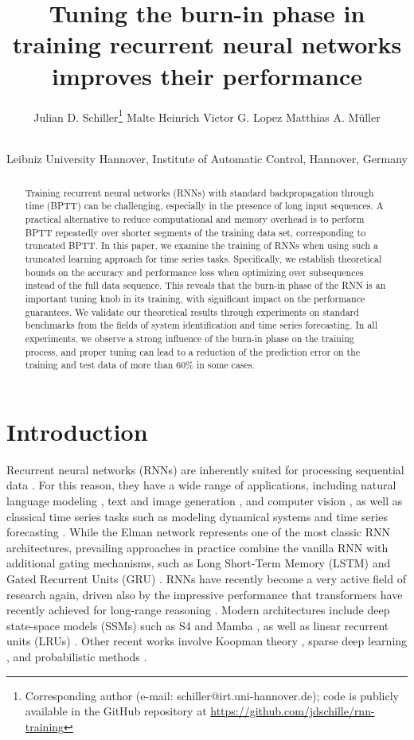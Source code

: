 \documentclass{article} %
\title{Tuning the burn-in phase in training recurrent neural networks improves their performance}
\author{%
  Julian D. Schiller\thanks{Corresponding author (e-mail: schiller@irt.uni-hannover.de); code is publicly available in the GitHub repository at \url{https://github.com/jdschille/rnn-training}} \And Malte Heinrich \And Victor G. Lopez \And Matthias A. Müller\and\\[-2.2ex]
  Leibniz University Hannover, Institute of Automatic Control, Hannover, Germany\\
}
\begin{document}
\maketitle

\begin{abstract}
	Training recurrent neural networks (RNNs) with standard backpropagation through time (BPTT) can be challenging, especially in the presence of long input sequences. A practical alternative to reduce computational and memory overhead is to perform BPTT repeatedly over shorter segments of the training data set, corresponding to truncated BPTT. In this paper, we examine the training of RNNs when using such a truncated learning approach for time series tasks. Specifically, we establish theoretical bounds on the accuracy and performance loss when optimizing over subsequences instead of the full data sequence. This reveals that the burn-in phase of the RNN is an important tuning knob in its training, with significant impact on the performance guarantees. We validate our theoretical results through experiments on standard benchmarks from the fields of system identification and time series forecasting. In all experiments, we observe a strong influence of the burn-in phase on the training process, and proper tuning can lead to a reduction of the prediction error on the training and test data of more than 60\% in some cases.
\end{abstract}

\section{Introduction}\label{sec:intro}
Recurrent neural networks (RNNs) are inherently suited for processing sequential data  \citep{Hewamalage2021,Lipton2015}. For this reason, they have a wide range of applications, including natural language modeling \citep{Khan2023,Mikolov2011,Mikolov2013}, text and image generation \citep{Sutskever2011,Gregor2015}, and computer vision \citep{Buhrmester2021}, as well as classical time series tasks such as modeling dynamical systems \citep{Pillonetto2025,Beintema2023a,Forgione2021,Forgione2021a,Schussler2019,Wang2006} and time series forecasting \citep{Hewamalage2021,Elsworth2020,Bianchi2017}.
While the Elman network \citep{Elman1990} represents one of the most classic RNN architectures, prevailing approaches in practice combine the vanilla RNN with additional gating mechanisms, such as Long Short-Term Memory (LSTM) \citep{Hochreiter1997} and Gated Recurrent Units (GRU) \citep {Cho2014}.
RNNs have recently become a very active field of research again, driven also by the impressive performance that transformers have recently achieved for long-range reasoning \citep{Kim2025}.
Modern architectures include deep state-space models (SSMs) such as S4 \citep{Gu2022} and Mamba \citep{Gu2024,Wang2025}, as well as linear recurrent units (LRUs) \citep{Orvieto2023,Zucchet2023}. Other recent works involve Koopman theory \citep{Li2025}, sparse deep learning \citep{Zhang2023}, and probabilistic methods \citep{Coscia2025}.
\end{document}
